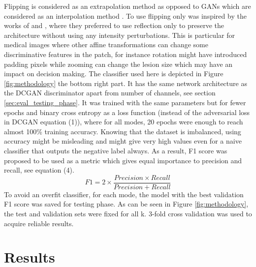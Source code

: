 \documentclass[final,3p,twocolumn,authoryear,sort&compress,times]{maia}
\begin{document}
Flipping is considered as an extrapolation method as opposed to GANs which are considered as an interpolation method \citep{GAN_brain_aug}. To use flipping only was inspired by the works of \citet{only_reflection} and \citet{ciGANs}, where they preferred to use reflection only to preserve the architecture without using any intensity perturbations. This is particular for medical images where other affine transformations can change some discriminative features in the patch, for instance rotation might have introduced padding pixels while zooming can change the lesion size which may have an impact on decision making.
The classifier used here is depicted in Figure \ref{fig:methodology} the bottom right part. It has the same network architecture as the DCGAN discriminator apart from number of channels, see section \ref{sec:eval_testing_phase}. It was trained with the same parameters but for fewer epochs and binary cross entropy as a loss function (instead of the adversarial loss in DCGAN equation (1)), where for all modes, 20 epochs were enough to reach almost 100\% training accuracy. Knowing that the dataset is imbalanced, using accuracy might be misleading and might give very high values even for a naive classifier that outputs the negative label always. As a result, F1 score was proposed to be used as a metric which gives equal importance to precision and recall, see equation (4).
\begin{equation}
    F1 = 2 \times \frac{Precision \times Recall}{Precision + Recall}
\end{equation}
To avoid an overfit classifier, for each mode, the model with the best validation F1 score was saved for testing phase. As can be seen in Figure \ref{fig:methodology}, the test and validation sets were fixed for all k. 3-fold cross validation was used to acquire reliable results.

\section{Results}
\label{sec:results}
\end{document}
